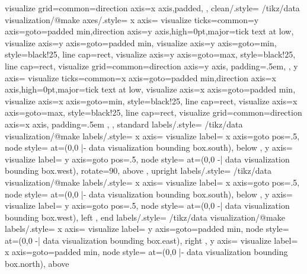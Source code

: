 {{{{        visualize grid={common={direction axis=x axis,padded}},
      }
    }
  },
  clean/.style={
    /tikz/data visualization/@make axes/.style={
      x axis={
        visualize ticks={common={y axis={goto=padded min},direction axis=y axis,high=0pt},major={tick text at low}},
        visualize axis={y axis={goto=padded min}},
        visualize axis={y axis={goto=min}, style={black!25, line cap=rect}},
        visualize axis={y axis={goto=max}, style={black!25, line cap=rect}},
        visualize grid={common={direction axis=y axis}},
        padding=.5em,
      },
      y axis={
        visualize ticks={common={x axis={goto=padded min},direction axis=x axis,high=0pt},major={tick text at low}},
        visualize axis={x axis={goto=padded min}},
        visualize axis={x axis={goto=min}, style={black!25, line cap=rect}},
        visualize axis={x axis={goto=max}, style={black!25, line cap=rect}},
        visualize grid={common={direction axis=x axis}},
        padding=.5em
      },
    }
  },
  standard labels/.style={
    /tikz/data visualization/@make labels/.style={
      x axis={
        visualize label={
          x axis={goto pos=.5},
          node style={
            at={(0,0 |- data visualization bounding box.south)},
            below
          }
        }
      },
      y axis={
        visualize label={
          y axis={goto pos=.5},
          node style={
            at={(0,0 -| data visualization bounding box.west)},
            rotate=90,
            above}
        }
      }
    }
  },
  upright labels/.style={
    /tikz/data visualization/@make labels/.style={
      x axis={
        visualize label={
          x axis={goto pos=.5},
          node style={
            at={(0,0 |- data visualization bounding box.south)},
            below
          }
        }
      },
      y axis={
        visualize label={
          y axis={goto pos=.5},
          node style={
            at={(0,0 -| data visualization bounding box.west)},
            left
          }
        }
      }
    }    
  },
  end labels/.style={
    /tikz/data visualization/@make labels/.style={
      x axis={
        visualize label={
          y axis={goto=padded min},
          node style={
            at={(0,0 -| data visualization bounding box.east)},
            right
          }
        }
      },
      y axis={
        visualize label={
          x axis={goto=padded min},
          node style={
            at={(0,0 |- data visualization bounding box.north)},
            above
          }
        }
      }
    }
  }
}



\endinput

